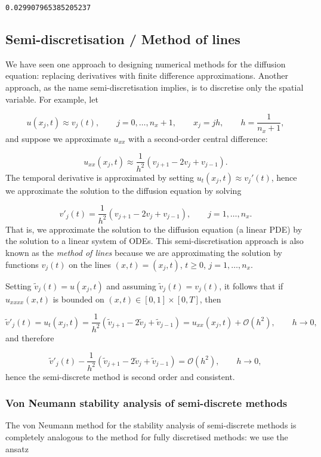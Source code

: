 \documentclass[12pt,landscape]{article}
\begin{document}
{\begin{lstlisting}
0.029907965385205237
\end{lstlisting}


\subsection{Semi-discretisation / Method of lines}
We have seen one approach to designing numerical methods for the diffusion equation: replacing derivatives with finite difference approximations.  Another approach, as the name semi-discretisation implies, is to discretise only the spatial variable.   For example, let

\[
u(x_j,t) \approx v_j(t), \qquad j  = 0, \ldots, n_x + 1, \qquad x_j = jh, \qquad h = \frac{1}{n_x + 1},
\]
and suppose we approximate $u_{xx}$ with a second-order central difference:

\[
u_{xx}(x_j,t) \approx  \frac{1}{h^2}\left(v_{j+1} - 2v_j + v_{j-1}   \right).
\]
The temporal derivative is approximated by setting $u_t(x_j,t) \approx v_j'(t)$,  hence we approximate the solution to the diffusion equation by solving

\[
v'_j(t) = \frac{1}{h^2}\left(v_{j+1} - 2v_j + v_{j-1}   \right), \qquad j  = 1, \ldots, n_x.
\]
That is, we approximate the solution to the diffusion equation (a linear PDE) by the solution to a linear system of ODEs.   This semi-discretisation approach is also known as the \emph{method of lines} because we are approximating the solution by functions $v_j(t)$ on the lines $(x,t) = (x_j,t)$, $t \geq 0$, $j = 1, \ldots, n_x$.

Setting $\tilde{v}_j(t) = u(x_j,t)$ and assuming $\tilde{v}_j(t) = v_j(t)$, it follows that if $u_{xxxx}(x,t)$ is bounded on $(x,t) \in [0,1]\times[0,T]$, then

\[
\tilde{v}'_j(t) = u_t(x_j,t) = \frac{1}{h^2}\left(\tilde{v}_{j+1} - 2\tilde{v}_j + \tilde{v}_{j-1}   \right) = u_{xx}(x_j,t) + \mathcal{O}(h^2), \qquad h \to 0,
\]
and therefore

\[
\tilde{v}'_j(t) - \frac{1}{h^2}\left(\tilde{v}_{j+1} - 2\tilde{v}_j + \tilde{v}_{j-1}   \right) = \mathcal{O}(h^2), \qquad h \to 0,
\]
hence the semi-discrete method is second order and consistent.

\subsubsection{Von Neumann stability analysis of semi-discrete methods}
The von Neumann method for the stability analysis of semi-discrete methods is completely analogous to the method for fully discretised methods: we use the ansatz

}
\end{document}
